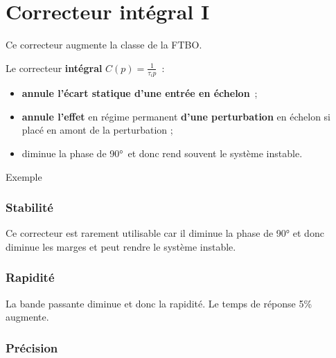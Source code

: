 \hypertarget{correcteur-intuxe9gral-i}{%
\section{Correcteur intégral I}\label{correcteur-intuxe9gral-i}}

\TLBodeCorrecteurI[1]


Ce correcteur augmente la classe de la FTBO.

Le correcteur \textbf{intégral} \(C(p) = \frac{1}{\tau_{i}p}\)~:

\begin{itemize}
\item
  \textbf{annule l'écart statique d'une entrée en échelon}~;
\item
  \textbf{annule l'effet} en régime permanent \textbf{d'une perturbation} en échelon si placé en amont de la perturbation ;
\item
  diminue la phase de 90°~et donc rend souvent le système instable.
\end{itemize}

Exemple

\begin{quote}

\end{quote}

\hypertarget{stabilituxe9-1}{%
\subsubsection*{Stabilité}\label{stabilituxe9-1}}

Ce correcteur est rarement utilisable car il diminue la phase de 90° et donc diminue les marges et peut rendre le système instable.

\hypertarget{rapidituxe9-1}{%
\subsubsection*{Rapidité}\label{rapidituxe9-1}}

La bande passante diminue et donc la rapidité. Le temps de réponse 5\% augmente.

\hypertarget{pruxe9cision-1}{%
\subsubsection*{Précision}\label{pruxe9cision-1}}

